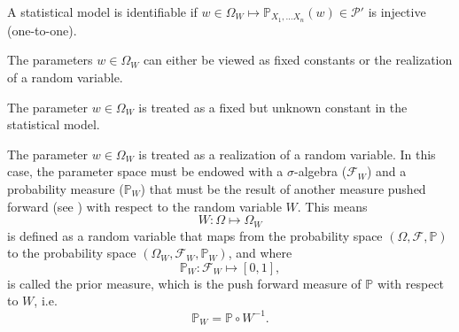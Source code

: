 \begin{definition}
	A statistical model is identifiable if $w\in \Omega_W \mapsto \mathbb{P}_{X_1,\dots X_n}(w)\in \mathcal{P}'$ is injective (one-to-one).
\end{definition}

The parameters $w\in \Omega_W$ can either be viewed as fixed constants or the realization of a random variable.
\begin{axiom}
	\label{ax:parameter_fixed}
	The parameter $w\in \Omega_W$ is treated as a fixed but unknown constant in the statistical model.
\end{axiom}
\begin{axiom}
	\label{ax:parameter_variable}
	The parameter $w\in \Omega_W$ is treated as a realization of a random variable. In this case, the parameter space must be endowed with a $\sigma$-algebra ($\mathcal{F}_W$) and a probability measure ($\mathbb{P}_W$) that must be the result of another measure pushed forward (see ) with respect to the random variable $W$. This means
	\begin{equation}
		W: \Omega \mapsto \Omega_W
	\end{equation}
	is defined as a random variable that maps from the probability space $(\Omega, \mathcal{F}, \mathbb{P})$ to the probability space $(\Omega_W,\mathcal{F}_W,\mathbb{P}_W)$, and where
	\begin{equation}
		\mathbb{P}_W: \mathcal{F}_W \mapsto [0,1],
	\end{equation}
	is called the prior measure, which is the push forward measure of $\mathbb{P}$ with respect to $W$, i.e.
	\begin{equation}
		\mathbb{P}_W = \mathbb{P}\circ W^{-1}.
	\end{equation}
\end{axiom}

